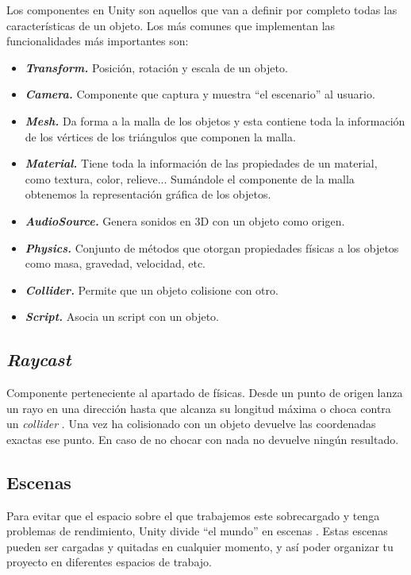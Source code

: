 Los componentes en Unity son aquellos que van a definir por completo todas las características de un objeto. Los más comunes que implementan las funcionalidades más importantes son:
\begin{itemize}
	\item\textbf{\textit{Transform.}} Posición, rotación y escala de un objeto.
	\item\textbf{\textit{Camera.}} Componente que captura y muestra “el escenario” al usuario.
	\item\textbf{\textit{Mesh.}} Da forma a la malla de los objetos y esta contiene toda la información de los vértices de los triángulos que componen la malla.
	\item\textbf{\textit{Material.}} Tiene toda la información de las propiedades de un material, como textura, color, relieve... Sumándole el componente de la malla obtenemos la representación gráfica de los objetos.
	\item\textbf{\textit{AudioSource.}} Genera sonidos en 3D con un objeto como origen.
	\item\textbf{\textit{Physics.}} Conjunto de métodos que otorgan propiedades físicas a los objetos como masa, gravedad, velocidad, etc.
	\item\textbf{\textit{Collider.}} Permite que un objeto colisione con otro.
	\item\textbf{\textit{Script.}} Asocia un script con un objeto.
	
\end{itemize}

\subsection{\textit{Raycast}}

Componente perteneciente al apartado de físicas. Desde un punto de origen lanza un rayo en una dirección hasta que alcanza su longitud máxima o choca contra un \textit{collider} \cite{unity:raycast}. Una vez ha colisionado con un objeto devuelve las coordenadas exactas ese punto. En caso de no chocar con nada no devuelve ningún resultado.

\subsection{Escenas}

Para evitar que el espacio sobre el que trabajemos este sobrecargado y tenga problemas de rendimiento, Unity divide “el mundo” en escenas \cite{unity:scenes}. Estas escenas pueden ser cargadas y quitadas en cualquier momento, y así poder organizar tu proyecto en diferentes espacios de trabajo. 

